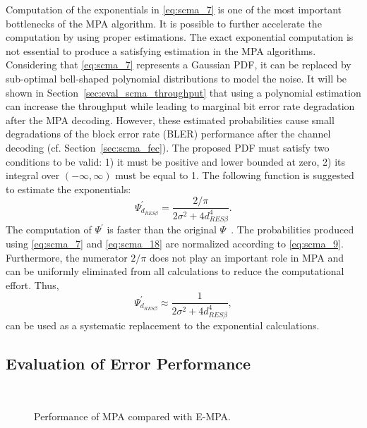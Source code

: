 Computation of the exponentials in \eqref{eq:scma_7} is one of the most
important bottlenecks of the MPA algorithm. It is possible to further accelerate
the computation by using proper estimations. The exact exponential computation
is not essential to produce a satisfying estimation in the MPA algorithms.
Considering that \eqref{eq:scma_7} represents a Gaussian PDF, it can be replaced
by sub-optimal bell-shaped polynomial distributions to model the noise. It will
be shown in Section~\ref{sec:eval_scma_throughput} that using a
polynomial estimation can increase the throughput while leading to marginal bit
error rate degradation after the MPA decoding. However, these estimated
probabilities cause small degradations of the block error rate (BLER)
performance after the channel decoding (cf. Section~\ref{sec:scma_fec}). The
proposed PDF must satisfy two conditions to be valid: 1) it must be positive and
lower bounded at zero, 2) its integral over $(-\infty, \infty)$ must be equal to
1. The following function is suggested to estimate the exponentials:
\begin{equation}
  \label{eq:scma_18}
  \Psi^{'}_{d_{RES \beta}} = \frac{2 / \pi}{2\sigma^2 + 4d^4_{RES \beta}}.
\end{equation}
The computation of $\Psi^{'}$ is faster than the original
$\Psi$~\cite{Ghaffari2017}. The probabilities produced using \eqref{eq:scma_7}
and \eqref{eq:scma_18} are normalized according to \eqref{eq:scma_9}.
Furthermore, the numerator $2/\pi$ does not play an important role in MPA and
can be uniformly eliminated from all calculations to reduce the computational
effort. Thus,
\begin{equation}
  \label{eq:scma_19}
  \Psi^{'}_{d_{RES \beta}} \approx \frac{1}{2\sigma^2 + 4d^4_{RES \beta}},
\end{equation}
can be used as a systematic replacement to the exponential calculations.

\subsection{Evaluation of Error Performance}
\label{sec:scma_perf}

\begin{figure}[htp]
  \centering
  \\
  \centering
  \caption{Performance of MPA compared with E-MPA.}
  \label{plot:scma_ber_uncoded}
\end{figure}

